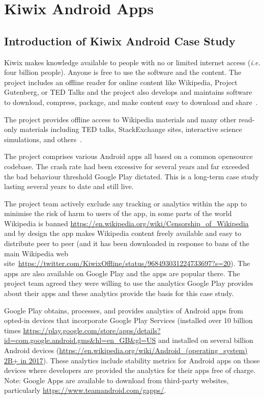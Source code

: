 \section{Kiwix Android Apps}
\label{section-kiwix-case-study}

\subsection{Introduction of Kiwix Android Case Study}
Kiwix makes knowledge available to people with no or limited internet access (\emph{i.e.} four billion people). Anyone is free to use the software and the content. The project includes an offline reader for online content like Wikipedia, Project Gutenberg, or TED Talks and the project also develops and maintains software to download, compress, package, and make content easy to download and share~\citep{kiwix_about_the_project, gomez2017_wikimedia_kiwix_article}.

The project provides offline access to Wikipedia materials and many other read-only materials including TED talks, StackExchange sites, interactive science simulations, and others~\citep{kiwix_about_the_project, gomez2017_wikimedia_kiwix_article}. 

The project comprises various Android apps all based on a common opensource codebase. The crash rate had been excessive for several years and far exceeded the bad behaviour threshold Google Play dictated. This is a long-term case study lasting several years to date and still live.

The project team actively exclude any tracking or analytics within the app to minimise the risk of harm to users of the app, in some parts of the world Wikipedia is banned \url{https://en.wikipedia.org/wiki/Censorship\_of\_Wikipedia} and by design the app makes Wikipedia content freely available and easy to distribute peer to peer (and it has been downloaded in response to bans of the main Wikipedia web site~\url{https://twitter.com/KiwixOffline/status/968493031224733697?s=20}). The apps are also available on Google Play and the apps are popular there. The project team agreed they were willing to use the analytics Google Play provides about their apps and these analytics provide the basis for this case study.

Google Play obtains, processes, and provides analytics of Android apps from opted-in devices that incorporate Google Play Services (installed over 10 billion times \url{https://play.google.com/store/apps/details?id=com.google.android.gms&hl=en\_GB&gl=US} and installed on several billion Android devices (\url{https://en.wikipedia.org/wiki/Android_(operating_system) 2B+ in 2017}). These analytics include stability metrics for Android apps on those devices where developers are provided the analytics for their apps free of charge.
Note: Google Apps are available to download from third-party websites, particularly \url{https://www.teamandroid.com/gapps/}. 


